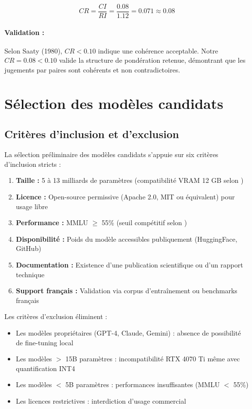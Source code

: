 \[
CR = \frac{CI}{RI} = \frac{0.08}{1.12} = 0.071 \approx 0.08
\]

\paragraph{Validation :} Selon Saaty (1980), $CR < 0.10$ indique une cohérence acceptable. Notre $CR = 0.08 < 0.10$ valide la structure de pondération retenue, démontrant que les jugements par paires sont cohérents et non contradictoires.

\section{Sélection des modèles candidats}

\subsection{Critères d'inclusion et d'exclusion}

La sélection préliminaire des modèles candidats s'appuie sur six critères d'inclusion stricts :

\begin{enumerate}
    \item \textbf{Taille :} 5 à 13 milliards de paramètres (compatibilité VRAM 12 GB selon \citealp{dettmers2023qlora})
    
    \item \textbf{Licence :} Open-source permissive (Apache 2.0, MIT ou équivalent) pour usage libre
    
    \item \textbf{Performance :} MMLU $\geq$ 55\% (seuil compétitif selon \citealp{hendrycks2021mmlu})
    
    \item \textbf{Disponibilité :} Poids du modèle accessibles publiquement (HuggingFace, GitHub)
    
    \item \textbf{Documentation :} Existence d'une publication scientifique ou d'un rapport technique
    
    \item \textbf{Support français :} Validation via corpus d'entraînement ou benchmarks français
\end{enumerate}

Les critères d'exclusion éliminent :

\begin{itemize}
    \item Les modèles propriétaires (GPT-4, Claude, Gemini) : absence de possibilité de fine-tuning local
    
    \item Les modèles $>$ 15B paramètres : incompatibilité RTX 4070 Ti même avec quantification INT4
    
    \item Les modèles $<$ 5B paramètres : performances insuffisantes (MMLU $<$ 55\%)
    
    \item Les licences restrictives : interdiction d'usage commercial
\end{itemize}

